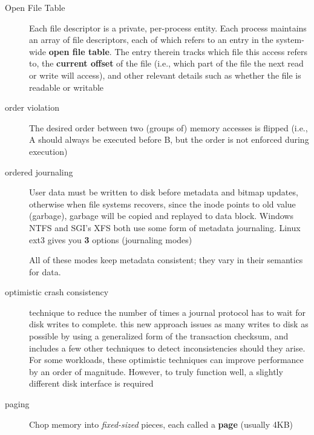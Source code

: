 \begin{description}
\item[Open File Table] Each file descriptor is a private, per-process entity. Each process maintains an array of file descriptors, each of which refers to an entry in the system-wide \textbf{open file table}. The entry therein tracks which file this access refers to, the \textbf{current offset} of the file (i.e., which part of the file the next read or write will access), and other relevant details such as whether the file is readable or writable

\item[order violation] The desired order between two (groups of) memory accesses is flipped (i.e., A should always be executed before B, but the order is not enforced during execution)

\item[ordered journaling] User data must be written to disk before metadata and bitmap updates, otherwise when file systems recovers, since the inode points to old value (garbage), garbage will be copied and replayed to data block. Windows NTFS and SGI’s XFS both use some form of metadata journaling. Linux ext3 gives you \textbf{3} options (journaling modes)
All of these modes keep metadata consistent; they vary in their semantics for data.

\item[optimistic crash consistency] technique to reduce the number of times a journal protocol has to wait for disk writes to complete.  this new approach issues as many writes to disk as possible by using a generalized form of the transaction checksum, and includes a few other techniques to detect inconsistencies should they arise. For some workloads, these optimistic techniques can improve performance by an order of magnitude. However, to truly function well, a slightly different disk interface is required

\item[paging] Chop memory into \emph{fixed-sized} pieces, each called a \textbf{page} (usually 4KB)


\end{description}
